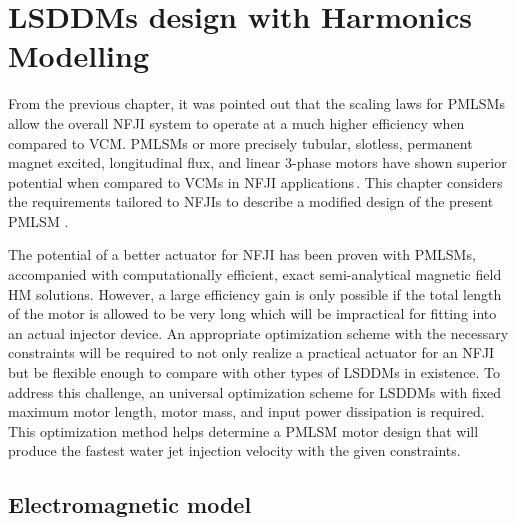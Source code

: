 \chapter{\acsp{LSDDM} design with Harmonics Modelling}   \label{Chapter:PMLSM design HM}


    From the previous chapter, it was pointed out that the scaling laws for \acfp{PMLSM} allow the overall \acf{NFJI} system to operate at a much higher efficiency when compared to \acf{VCM}. \acsp{PMLSM} or more precisely tubular, slotless, permanent magnet excited, longitudinal flux, and linear 3-phase motors have shown superior potential when compared to \acsp{VCM} in \acs{NFJI} applications\,\cite{Ruddy2015}. This chapter considers the requirements tailored to \acsp{NFJI} to describe a modified design of the present \acs{PMLSM} . 


    The potential of a better actuator for \acs{NFJI} has been proven with \acsp{PMLSM}, accompanied with computationally efficient, exact semi-analytical magnetic field \acf{HM} solutions. However, a large efficiency gain is only possible if the total length of the motor is allowed to be very long which will be impractical for fitting into an actual injector device. An appropriate optimization scheme with the necessary constraints will be required to not only realize a practical actuator for an \acs{NFJI} but be flexible enough to compare with other types of \acsp{LSDDM} in existence. To address this challenge, an universal optimization scheme for \acsp{LSDDM} with fixed maximum motor length, motor mass, and input power dissipation is required. This optimization method helps determine a \acs{PMLSM} motor design that will produce the fastest water jet injection velocity with the given constraints. 


\section{Electromagnetic model}                 \label{Chapter:PMLSM design HM/electromagnetic model}


